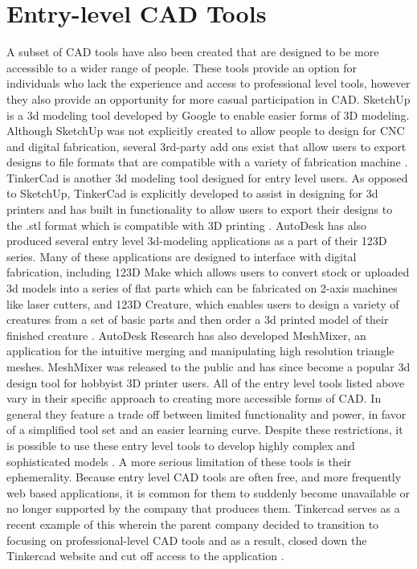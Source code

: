 \section{Entry-level CAD Tools}
A subset of CAD tools have also been created that are designed to be more accessible to a wider range of people. These tools provide an option for individuals who lack the experience and access to professional level tools, however they also provide an opportunity for more casual participation in CAD. SketchUp is a 3d modeling tool developed by Google to enable easier forms of 3D modeling. Although SketchUp was not explicitly created to allow people to design for CNC and digital fabrication, several 3rd-party add ons exist that allow users to export designs to file formats that are compatible with a variety of fabrication machine \cite{sketchup}. TinkerCad is another 3d modeling tool designed for entry level users.  As opposed to SketchUp, TinkerCad is explicitly developed to assist in designing for 3d printers and has built in functionality to allow users to export their designs to the .stl format which is compatible with 3D printing \cite{tinkercad}. AutoDesk has also produced several entry level 3d-modeling applications as a part of their 123D series. Many of these applications are designed to interface with digital fabrication, including 123D Make which allows users to convert stock or uploaded 3d models into a series of flat parts which can be fabricated on 2-axis machines like laser cutters, and 123D Creature, which enables users to design a variety of creatures from a set of basic parts and then order a 3d printed model of their finished creature \cite{123D}.  AutoDesk Research has also developed MeshMixer, an application for the intuitive merging and manipulating high resolution triangle meshes. MeshMixer was released to the public and has since become a popular 3d design tool for hobbyist 3D printer users. 
All of the entry level tools listed above vary in their specific approach to creating more accessible forms of CAD. In general they feature a trade off between limited functionality and power, in favor of a simplified tool set and an easier learning curve. Despite these restrictions, it is possible to use these entry level tools to develop highly  complex and sophisticated models . A more serious limitation of these tools is their ephemerality. Because entry level CAD tools are often free, and more frequently web based applications, it is common for them to suddenly become unavailable or no longer supported by the company that produces them. Tinkercad serves as a recent example of this wherein the parent company decided to transition to focusing on professional-level CAD tools and as a result, closed down the Tinkercad website and cut off access to the application . 
